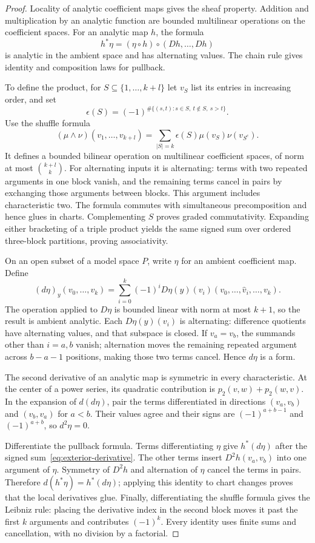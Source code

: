 \documentclass[11pt]{amsart}
\theoremstyle{definition}
\theoremstyle{remark}
\numberwithin{equation}{section}
\newcommand{\abs}[1]{\lvert #1\rvert}
\begin{document}
\begin{proof}
Locality of analytic coefficient maps gives the sheaf property. Addition and multiplication by an analytic function are bounded multilinear operations on the coefficient spaces. For an analytic map $h$, the formula
\[
 h^*\eta=(\eta\circ h)\circ(Dh,\ldots,Dh)
\]
is analytic in the ambient space and has alternating values. The chain rule gives identity and composition laws for pullback.

To define the product, for $S\subseteq\{1,\ldots,k+l\}$ let $v_S$ list its entries in increasing order, and set
\[
 \epsilon(S)=(-1)^{\#\{(s,t):s\in S,\ t\notin S,\ s>t\}}.
\]
Use the shuffle formula
\[
 (\mu\wedge\nu)(v_1,\ldots,v_{k+l})
 =\sum_{\abs{S}=k}\epsilon(S)\mu(v_S)\nu(v_{S^c}).
\]
It defines a bounded bilinear operation on multilinear coefficient spaces, of norm at most $\binom{k+l}{k}$. For alternating inputs it is alternating: terms with two repeated arguments in one block vanish, and the remaining terms cancel in pairs by exchanging those arguments between blocks. This argument includes characteristic two. The formula commutes with simultaneous precomposition and hence glues in charts. Complementing $S$ proves graded commutativity. Expanding either bracketing of a triple product yields the same signed sum over ordered three-block partitions, proving associativity.

On an open subset of a model space $P$, write $\eta$ for an ambient coefficient map. Define
\begin{equation}\label{eq:exterior-derivative}
 (d\eta)_y(v_0,\ldots,v_k)
 =\sum_{i=0}^k(-1)^iD\eta(y)(v_i)
       (v_0,\ldots,\widehat v_i,\ldots,v_k).
\end{equation}
The operation applied to $D\eta$ is bounded linear with norm at most $k+1$, so the result is ambient analytic. Each $D\eta(y)(v_i)$ is alternating: difference quotients have alternating values, and that subspace is closed. If $v_a=v_b$, the summands other than $i=a,b$ vanish; alternation moves the remaining repeated argument across $b-a-1$ positions, making those two terms cancel. Hence $d\eta$ is a form.

The second derivative of an analytic map is symmetric in every characteristic. At the center of a power series, its quadratic contribution is $p_2(v,w)+p_2(w,v)$. In the expansion of $d(d\eta)$, pair the terms differentiated in directions $(v_a,v_b)$ and $(v_b,v_a)$ for $a<b$. Their values agree and their signs are $(-1)^{a+b-1}$ and $(-1)^{a+b}$, so $d^2\eta=0$.

Differentiate the pullback formula. Terms differentiating $\eta$ give $h^*(d\eta)$ after the signed sum~\eqref{eq:exterior-derivative}. The other terms insert $D^2h(v_a,v_b)$ into one argument of $\eta$. Symmetry of $D^2h$ and alternation of $\eta$ cancel the terms in pairs. Therefore $d(h^*\eta)=h^*(d\eta)$; applying this identity to chart changes proves that the local derivatives glue. Finally, differentiating the shuffle formula gives the Leibniz rule: placing the derivative index in the second block moves it past the first $k$ arguments and contributes $(-1)^k$. Every identity uses finite sums and cancellation, with no division by a factorial.
\end{proof}
\end{document}
